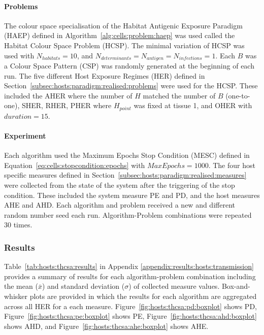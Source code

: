 \paragraph{Problems}
The colour space specialisation of the Habitat Antigenic Exposure Paradigm (HAEP) defined in Algorithm~\ref{alg:cells:problem:haep} was used called the Habitat Colour Space Problem (HCSP). The minimal variation of HCSP was used with $N_{habitats}=10$, and $N_{determinants} = N_{antigen} = N_{infections} = 1$. Each $B$ was a Colour Space Pattern (CSP) was randomly generated at the beginning of each run.
The five different Host Exposure Regimes (HER) defined in Section~\ref{subsec:hosts:paradigm:realised:problems} were used for the HCSP. These included the AHER where the number of $H$ matched the number of $B$ (one-to-one), SHER, RHER, PHER where $H_{point}$ was fixed at tissue 1, and OHER with $duration=15$.

%
%
\paragraph{Experiment}
Each algorithm used the Maximum Epochs Stop Condition (MESC) defined in Equation~\ref{eq:cells:stopcondition:epochs} with $MaxEpochs=1000$. The four host specific measures defined in Section~\ref{subsec:hosts:paradigm:realised:measures} were collected from the state of the system after the triggering of the stop condition. These included the system measure PE and PD, and the host measures AHE and AHD. Each algorithm and problem received a new and different random number seed each run. Algorithm-Problem combinations were repeated 30 times.

%
%
\subsubsection{Results}
Table~\ref{tab:hosts:thcsa:results} in Appendix \ref{appendix:results:hosts:transmission} provides a summary of results for each algorithm-problem combination including the mean ($\bar{x}$) and standard deviation ($\sigma$) of collected measure values. Box-and-whisker plots are provided in which the results for each algorithm are aggregated across all HER for a each measure. Figure~\ref{fig:hosts:thcsa:pd:boxplot} shows PD, Figure~\ref{fig:hosts:thcsa:pe:boxplot} shows PE, Figure~\ref{fig:hosts:thcsa:ahd:boxplot} shows AHD, and Figure~\ref{fig:hosts:thcsa:ahe:boxplot} shows AHE.
		
